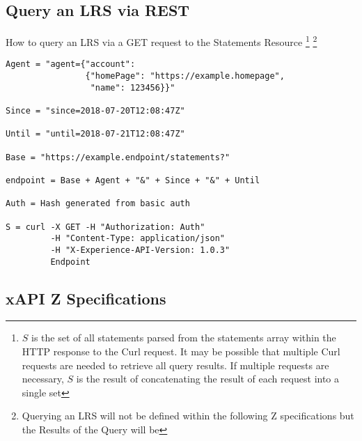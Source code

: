 \documentclass{article}
\begin{document}
  \subsection{Query an LRS via REST}
  How to query an LRS via a GET request to the Statements Resource
  \footnote{\label{moreLink} $S$ is the set of all statements parsed
    from the statements array within the HTTP response to the Curl
    request. It may be possible that multiple Curl requests are needed
    to retrieve all query results. If multiple requests are necessary,
    $S$ is the result of concatenating the result of each request into
    a single set}
  \footnote{\label{noZ} Querying an LRS will not be defined within the
  following Z specifications but the Results of the Query will be}
  \begin{lstlisting}[frame=single]
Agent = "agent={"account":
                {"homePage": "https://example.homepage",
                 "name": 123456}}"

Since = "since=2018-07-20T12:08:47Z"

Until = "until=2018-07-21T12:08:47Z"

Base = "https://example.endpoint/statements?"

endpoint = Base + Agent + "&" + Since + "&" + Until

Auth = Hash generated from basic auth

S = curl -X GET -H "Authorization: Auth"
         -H "Content-Type: application/json"
         -H "X-Experience-API-Version: 1.0.3"
         Endpoint
  \end{lstlisting}

  \subsection{xAPI Z Specifications}




\end{document}
